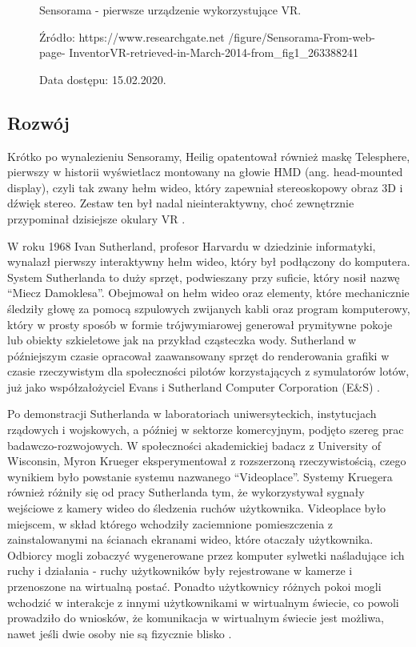 \begin{figure}[ht]
\begin{minipage}{0.45\textwidth}
        \caption{Sensorama - pierwsze urządzenie wykorzystujące VR.}
        \caption*{Źródło: https://www.researchgate.net
        /figure/Sensorama-From-web-page-
        InventorVR-retrieved-in-March-2014-from\_fig1\_263388241}
        \caption*{Data dostępu: 15.02.2020.}
        \label{fig:sensorama2}
    \end{minipage}
\end{figure}


\subsection{Rozwój}

Krótko po wynalezieniu Sensoramy, Heilig opatentował również maskę Telesphere, pierwszy w historii wyświetlacz montowany na głowie HMD (ang. head-mounted display), czyli tak zwany hełm wideo, który zapewniał stereoskopowy obraz 3D i dźwięk stereo. Zestaw ten był nadal nieinteraktywny, choć zewnętrznie przypominał dzisiejsze okulary VR \citep{website:virtualspeech}.

W roku 1968 Ivan Sutherland, profesor Harvardu w dziedzinie informatyki, wynalazł pierwszy interaktywny hełm wideo, który był podłączony do komputera. System Sutherlanda to duży sprzęt, podwieszany przy suficie, który nosił nazwę ``Miecz Damoklesa''. Obejmował on hełm wideo oraz elementy, które mechanicznie śledziły głowę za pomocą szpulowych zwijanych kabli oraz program komputerowy, który w prosty sposób w formie trójwymiarowej generował prymitywne pokoje lub obiekty szkieletowe jak na przykład cząsteczka wody.  Sutherland w późniejszym czasie opracował zaawansowany sprzęt do renderowania grafiki w czasie rzeczywistym dla społeczności pilotów korzystających z symulatorów lotów, już jako  współzałożyciel Evans i Sutherland Computer Corporation (E&S) \citep{virtualdev}.


Po demonstracji Sutherlanda w laboratoriach uniwersyteckich, instytucjach rządowych i wojskowych, a później w sektorze komercyjnym, podjęto szereg prac badawczo-rozwojowych. W społeczności akademickiej badacz z University of Wisconsin, Myron Krueger eksperymentował z rozszerzoną rzeczywistością, czego wynikiem było powstanie systemu nazwanego ``Videoplace''. Systemy Kruegera również różniły się od pracy Sutherlanda tym, że wykorzystywał sygnały wejściowe z kamery wideo do śledzenia ruchów użytkownika. Videoplace było miejscem, w skład którego wchodziły zaciemnione pomieszczenia z zainstalowanymi na ścianach ekranami wideo, które otaczały użytkownika. Odbiorcy mogli zobaczyć wygenerowane przez komputer sylwetki naśladujące ich ruchy i działania - ruchy użytkowników były rejestrowane w kamerze i przenoszone na wirtualną postać. Ponadto użytkownicy różnych pokoi mogli wchodzić w interakcje z innymi użytkownikami w wirtualnym świecie, co powoli prowadziło do wniosków, że komunikacja w wirtualnym świecie jest możliwa, nawet jeśli dwie osoby nie są fizycznie blisko \citep{website:virtualspeech}.


